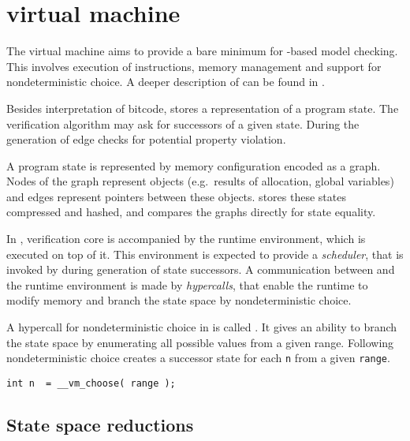 \section{\DIVINE virtual machine}

The \DIVINE virtual machine aims to provide a bare minimum for \LLVM-based
model checking. This involves execution of instructions, memory management and
support for nondeterministic choice. A deeper description of
\DIVM can be found in \cite{RockaiCB17}.

Besides interpretation of \LLVM bitcode, \DIVM stores a representation of a
program state. The verification algorithm may ask \DIVM for
successors of a given state. During the generation of edge \DIVM checks for
potential property violation.

A program state is represented by memory configuration encoded as a graph.
Nodes of the graph represent objects (e.g.~results of allocation, global
variables) and edges represent pointers between these objects.
\DIVM stores these states compressed and hashed, and compares the graphs
directly for state equality.

In \DIVINE, verification core is accompanied by the runtime environment, which
is executed on top of it. This environment is expected to provide a
\emph{scheduler}, that is invoked by \DIVM during generation of state
successors. A communication between \DIVM and the runtime environment is made by
\emph{hypercalls}, that enable the runtime to modify memory and branch the state
space by nondeterministic choice.

\begin{example}
A hypercall for nondeterministic choice in \DIVM is called .
It gives an ability to branch the state space by enumerating all possible values
from a given range. Following nondeterministic
choice creates a successor state for each \texttt{n} from a given \texttt{range}.

\begin{verbatim}
int n  = __vm_choose( range );
\end{verbatim}

\end{example}
\subsection{State space reductions}

